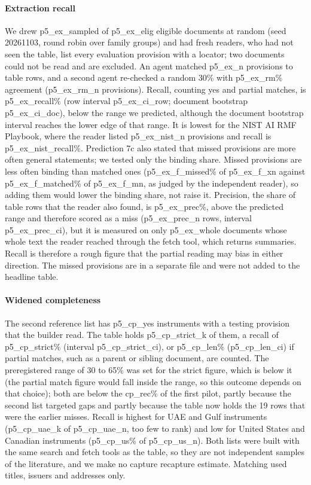 \documentclass[conference]{IEEEtran}
\begin{document}
\paragraph{Extraction recall} We drew {{p5_ex_sampled}} of {{p5_ex_elig}} eligible documents at random (seed 20261103, round robin over family groups) and had fresh readers, who had not seen the table, list every evaluation provision with a locator; two documents could not be read and are excluded. An agent matched {{p5_ex_n}} provisions to table rows, and a second agent re-checked a random 30\% with {{p5_ex_rm}}\% agreement ({{p5_ex_rm_n}} provisions). Recall, counting yes and partial matches, is {{p5_ex_recall}}\% (row interval {{p5_ex_ci_row}}; document bootstrap {{p5_ex_ci_doc}}), below the range we predicted, although the document bootstrap interval reaches the lower edge of that range. It is lowest for the NIST AI RMF Playbook, where the reader listed {{p5_ex_nist_n}} provisions and recall is {{p5_ex_nist_recall}}\%. Prediction 7c also stated that missed provisions are more often general statements; we tested only the binding share. Missed provisions are less often binding than matched ones ({{p5_ex_f_missed}}\% of {{p5_ex_f_xn}} against {{p5_ex_f_matched}}\% of {{p5_ex_f_mn}}, as judged by the independent reader), so adding them would lower the binding share, not raise it. Precision, the share of table rows that the reader also found, is {{p5_ex_prec}}\%, above the predicted range and therefore scored as a miss ({{p5_ex_prec_n}} rows, interval {{p5_ex_prec_ci}}), but it is measured on only {{p5_ex_whole}} documents whose whole text the reader reached through the fetch tool, which returns summaries. Recall is therefore a rough figure that the partial reading may bias in either direction. The missed provisions are in a separate file and were not added to the headline table.

\paragraph{Widened completeness} The second reference list has {{p5_cp_yes}} instruments with a testing provision that the builder read. The table holds {{p5_cp_strict_k}} of them, a recall of {{p5_cp_strict}}\% (interval {{p5_cp_strict_ci}}), or {{p5_cp_len}}\% ({{p5_cp_len_ci}}) if partial matches, such as a parent or sibling document, are counted. The preregistered range of 30 to 65\% was set for the strict figure, which is below it (the partial match figure would fall inside the range, so this outcome depends on that choice); both are below the {{cp_rec}}\% of the first pilot, partly because the second list targeted gaps and partly because the table now holds the 19 rows that were the earlier misses. Recall is highest for UAE and Gulf instruments ({{p5_cp_uae_k}} of {{p5_cp_uae_n}}, too few to rank) and low for United States and Canadian instruments ({{p5_cp_us}}\% of {{p5_cp_us_n}}). Both lists were built with the same search and fetch tools as the table, so they are not independent samples of the literature, and we make no capture recapture estimate. Matching used titles, issuers and addresses only.
\end{document}
